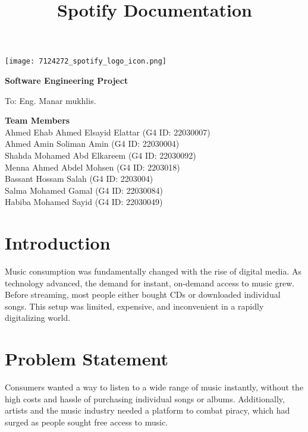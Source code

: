 \documentclass[a4paper,10pt]{article}
\title{\Huge \textbf{Spotify Documentation}}
\date{}
\begin{document}
\begin{titlepage}
    \centering
    \vspace*{2cm}

    \vspace{1cm}
    \texttt{[image: 7124272\_spotify\_logo\_icon.png]}

    \vspace{1cm}
    \Huge
    \textbf{Software Engineering Project}

    \vspace{1cm}
    \LARGE
    To: Eng. Manar mukhlis.

    \vfill
    
    \Large
    \textbf{Team Members} \\
    Ahmed Ehab Ahmed Elsayid Elattar (G4 ID: 22030007) \\
    Ahmed Amin Soliman Amin (G4 ID: 22030004) \\
    Shahda Mohamed Abd Elkareem (G4 ID: 22030092) \\
    Menna Ahmed Abdel Mohsen (G4 ID: 2203018) \\
    Bassant Hossam Salah (G4 ID: 2203004) \\
    Salma Mohamed Gamal (G4 ID: 22030084) \\
    Habiba Mohamed Sayid (G4 ID: 22030049)

    \vspace{2cm}
\end{titlepage}

\newpage
\tableofcontents
\newpage

\section{Introduction}
Music consumption was fundamentally changed with the rise of digital media. As technology advanced, the demand for instant, on-demand access to music grew. Before streaming, most people either bought CDs or downloaded individual songs. This setup was limited, expensive, and inconvenient in a rapidly digitalizing world.

\section{Problem Statement}
Consumers wanted a way to listen to a wide range of music instantly, without the high costs and hassle of purchasing individual songs or albums. Additionally, artists and the music industry needed a platform to combat piracy, which had surged as people sought free access to music.
\end{document}
